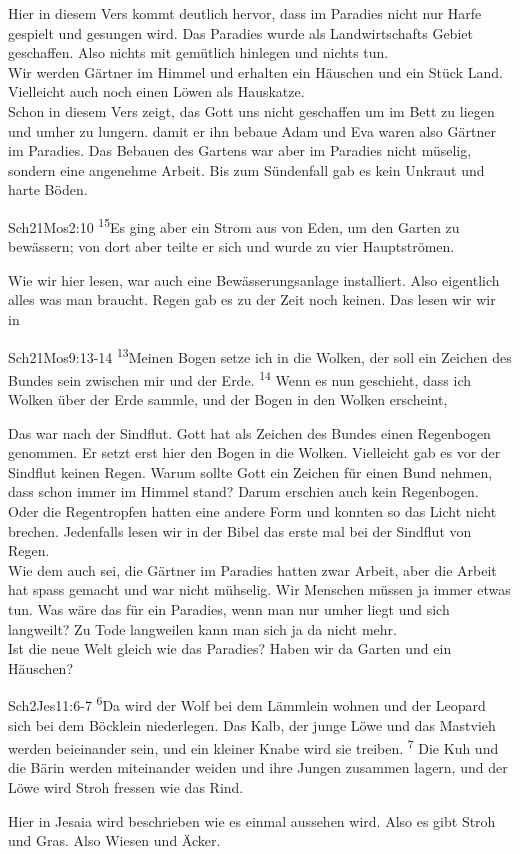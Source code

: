 Hier in diesem Vers kommt deutlich hervor, dass im Paradies nicht nur Harfe gespielt und gesungen wird. Das Paradies wurde als Landwirtschafts Gebiet geschaffen. Also nichts mit gemütlich hinlegen und nichts tun.\\
Wir werden Gärtner im Himmel und erhalten ein Häuschen und ein Stück Land. Vielleicht auch noch einen Löwen als Hauskatze.\\
Schon in diesem Vers zeigt, das Gott uns nicht geschaffen um im Bett zu liegen und umher zu lungern. \flqq damit er ihn bebaue\frqq{} Adam und Eva waren also Gärtner im Paradies. Das Bebauen des Gartens war aber im Paradies nicht müselig, sondern eine angenehme Arbeit. Bis zum Sündenfall gab es kein Unkraut und harte Böden.
\begin{bibeltext}{Sch2}{1Mos}{2:10}
    \textsuperscript{15}Es ging aber ein Strom aus von Eden, um den Garten zu bewässern; von dort aber teilte er sich und wurde zu vier Hauptströmen.
\end{bibeltext}
Wie wir hier lesen, war auch eine Bewässerungsanlage installiert. Also eigentlich alles was man braucht. Regen gab es zu der Zeit noch keinen. Das lesen wir wir in
\begin{bibeltext}{Sch2}{1Mos}{9:13-14}
    \textsuperscript{13}Meinen Bogen setze ich in die Wolken, der soll ein Zeichen des Bundes sein zwischen mir und der Erde.
    \textsuperscript{14} Wenn es nun geschieht, dass ich Wolken über der Erde sammle, und der Bogen in den Wolken erscheint,
\end{bibeltext}
Das war nach der Sindflut. Gott hat als Zeichen des Bundes einen Regenbogen genommen. Er setzt erst hier den Bogen in die Wolken. Vielleicht gab es vor der Sindflut keinen Regen. Warum sollte Gott ein Zeichen für einen Bund nehmen, dass schon immer im Himmel stand?
Darum erschien auch kein Regenbogen. Oder die Regentropfen hatten eine andere Form und konnten so das Licht nicht brechen. Jedenfalls lesen wir in der Bibel das erste mal bei der Sindflut von Regen.\\
Wie dem auch sei, die Gärtner im Paradies hatten zwar Arbeit, aber die Arbeit hat spass gemacht und war nicht mühselig. Wir Menschen müssen ja immer etwas tun. Was wäre das für ein Paradies, wenn man nur umher liegt und sich langweilt? Zu Tode langweilen kann man sich ja da nicht mehr.\\ Ist die neue Welt gleich wie das Paradies? Haben wir da Garten und ein Häuschen?\\
\begin{bibeltext}{Sch2}{Jes}{11:6-7}
    \textsuperscript{6}Da wird der Wolf bei dem Lämmlein wohnen und der Leopard sich bei dem Böcklein niederlegen. Das Kalb, der junge Löwe und das Mastvieh werden beieinander sein, und ein kleiner Knabe wird sie treiben.
    \textsuperscript{7} Die Kuh und die Bärin werden miteinander weiden und ihre Jungen zusammen lagern, und der Löwe wird Stroh fressen wie das Rind.
\end{bibeltext}
Hier in Jesaia wird beschrieben wie es einmal aussehen wird. Also es gibt Stroh und Gras. Also Wiesen und Äcker.
